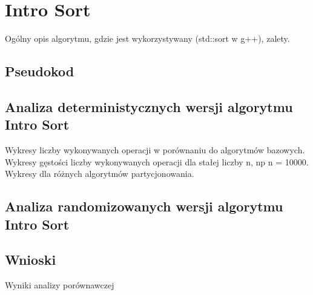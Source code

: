 \section{Intro Sort}
Ogólny opis algorytmu, gdzie jest wykorzystywany (std::sort w g++), zalety.

\subsection{Pseudokod}

\subsection{Analiza deterministycznych wersji algorytmu Intro Sort}
Wykresy liczby wykonywanych operacji w porównaniu do algorytmów bazowych.
Wykresy gęstości liczby wykonywanych operacji dla stałej liczby n, np n = 10000.
Wykresy dla różnych algorytmów partycjonowania.

\begin{figure}[]
	\centering
	
	\caption[]{}
	\label{fig:intro-sort-deterministic-pivot-random}
\end{figure}

\begin{figure}[]
	\centering
	
	\caption[]{}
	\label{fig:intro-sort-deterministic-pivot-random-all}
\end{figure}

\subsection{Analiza randomizowanych wersji algorytmu Intro Sort}

\subsection{Wnioski}
Wyniki analizy porównawczej

